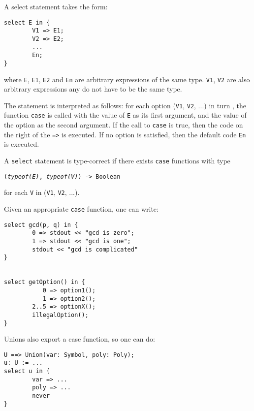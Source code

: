 A select statement takes the form:
\begin{small}
\begin{verbatim}
select E in {
        V1 => E1;
        V2 => E2;
        ...
        En;
}
\end{verbatim}
\end{small}

where {\tt E}, {\tt E1}, {\tt E2} and {\tt En} are arbitrary expressions of
the same type. {\tt V1}, {\tt V2} are also arbitrary expressions any do
not have to be the same type.

The statement is interpreted as follows: for each option ({\tt V1}, {\tt V2},
...) in turn , the function {\tt case} is called with the value of {\tt E} as
its first argument, and the value of the option as the second argument.
If the call to {\tt case} is true, then the code on the right of the {\tt =>}
is executed.  If no option is satisfied, then the default code {\tt En} is
executed.

A {\tt select} statement is type-correct if there exists {\tt case}
functions with type
\begin{small}
{\tt ({\em typeof({\tt E})}, {\em typeof({\tt V})}) -> Boolean}
\end{small}
for each {\tt V} in {({\tt V1}, {\tt V2}, ...)}.

Given an appropriate {\tt case} function, one can write:

\begin{small}
\begin{verbatim}
select gcd(p, q) in {
        0 => stdout << "gcd is zero";
        1 => stdout << "gcd is one";
        stdout << "gcd is complicated"
}


select getOption() in {
           0 => option1();
           1 => option2();
        2..5 => optionX();
        illegalOption();
}
\end{verbatim}
\end{small}

Unions also export a case function, so one can do:

\begin{small}
\begin{verbatim}
U ==> Union(var: Symbol, poly: Poly);
u: U := ...
select u in {
        var => ...
        poly => ...
        never
}
\end{verbatim}
\end{small}


